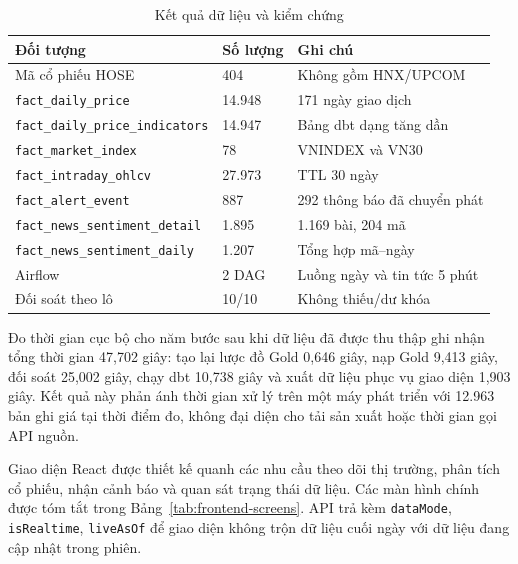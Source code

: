 \documentclass[conference,a4paper]{IEEEtran}
\newcommand{\code}[1]{\texttt{#1}}
\begin{document}
\begin{table}[t]
\caption{Kết quả dữ liệu và kiểm chứng}
\label{tab:results}
\centering
\scriptsize
\begin{tabular}{p{3.1cm}p{1.2cm}p{2.4cm}}
\toprule
\textbf{Đối tượng} & \textbf{Số lượng} & \textbf{Ghi chú} \\
\midrule
Mã cổ phiếu HOSE & 404 & Không gồm HNX/UPCOM \\
\code{fact\_daily\_price} & 14.948 & 171 ngày giao dịch \\
\code{fact\_daily\_price\_indicators} & 14.947 & Bảng dbt dạng tăng dần \\
\code{fact\_market\_index} & 78 & VNINDEX và VN30 \\
\code{fact\_intraday\_ohlcv} & 27.973 & TTL 30 ngày \\
\code{fact\_alert\_event} & 887 & 292 thông báo đã chuyển phát \\
\code{fact\_news\_sentiment\_detail} & 1.895 & 1.169 bài, 204 mã \\
\code{fact\_news\_sentiment\_daily} & 1.207 & Tổng hợp mã--ngày \\
Airflow & 2 DAG & Luồng ngày và tin tức 5 phút \\
Đối soát theo lô & 10/10 & Không thiếu/dư khóa \\
\bottomrule
\end{tabular}
\end{table}

Đo thời gian cục bộ cho năm bước sau khi dữ liệu đã được thu thập ghi nhận tổng thời gian 47,702 giây: tạo lại lược đồ Gold 0,646 giây, nạp Gold 9,413 giây, đối soát 25,002 giây, chạy dbt 10,738 giây và xuất dữ liệu phục vụ giao diện 1,903 giây. Kết quả này phản ánh thời gian xử lý trên một máy phát triển với 12.963 bản ghi giá tại thời điểm đo, không đại diện cho tải sản xuất hoặc thời gian gọi API nguồn.

Giao diện React được thiết kế quanh các nhu cầu theo dõi thị trường, phân tích cổ phiếu, nhận cảnh báo và quan sát trạng thái dữ liệu. Các màn hình chính được tóm tắt trong Bảng~\ref{tab:frontend-screens}. API trả kèm \code{dataMode}, \code{isRealtime}, \code{liveAsOf} để giao diện không trộn dữ liệu cuối ngày với dữ liệu đang cập nhật trong phiên.
\end{document}
